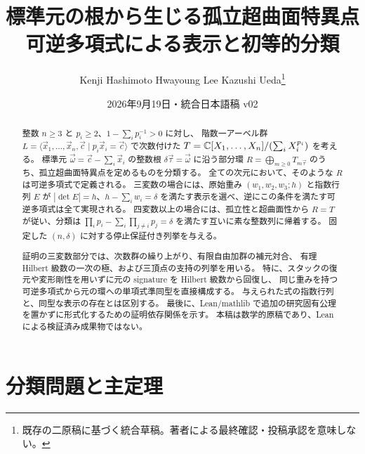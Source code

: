 \documentclass[11pt,a4paper]{ltjsarticle}
\title{標準元の根から生じる孤立超曲面特異点\\[3pt]
\large 可逆多項式による表示と初等的分類}
\author{Kenji Hashimoto \qquad Hwayoung Lee \qquad Kazushi Ueda\thanks{既存の二原稿に基づく統合草稿。著者による最終確認・投稿承認を意味しない。}}
\date{2026年9月19日・統合日本語稿 v02}
\numberwithin{equation}{section}
\theoremstyle{definition}
\newcommand{\cc}{\vec c}\newcommand{\xx}{\vec x}\newcommand{\om}{\vec\omega}\newcommand{\ta}{\vec\tau}
\begin{document}
\maketitle
\begin{abstract}
整数 $n\ge3$ と $p_i\ge2$、$1-\sum_i p_i^{-1}>0$ に対し、
階数一アーベル群 $L=\langle\xx_1,\dots,\xx_n,\cc\mid p_i\xx_i=\cc\rangle$ で次数付けた
$T=\mathbb C[X_1,\dots,X_n]/(\sum_i X_i^{p_i})$ を考える。
標準元 $\om=\cc-\sum_i\xx_i$ の整数根 $\delta\ta=\om$ に沿う部分環
$R=\bigoplus_{m\ge0}T_{m\ta}$ のうち、孤立超曲面特異点を定めるものを分類する。
全ての次元において、そのような $R$ は可逆多項式で定義される。
三変数の場合には、原始重み $(w_1,w_2,w_3;h)$ と指数行列 $E$ が
$|\det E|=h$、$h-\sum_iw_i=\delta$ を満たす表示を選べ、逆にこの条件を満たす可逆多項式は全て実現される。
四変数以上の場合には、孤立性と超曲面性から $R=T$ が従い、分類は
$\prod_i p_i-\sum_i\prod_{j\ne i}p_j=\delta$ を満たす互いに素な整数列に帰着する。
固定した $(n,\delta)$ に対する停止保証付き列挙を与える。

証明の三変数部分では、次数群の繰り上がり、有限自由加群の補元対合、
有理 Hilbert 級数の一次の極、および三頂点の支持の列挙を用いる。
特に、スタックの復元や変形剛性を用いずに元の signature を Hilbert 級数から回復し、
同じ重みを持つ可逆多項式から元の環への単項式準同型を直接構成する。
与えられた式の指数行列と、同型な表示の存在とは区別する。
最後に、Lean/mathlib で追加の研究固有公理を置かずに形式化するための証明依存関係を示す。
本稿は数学的原稿であり、Lean による検証済み成果物ではない。
\end{abstract}
\clearpage
\setcounter{tocdepth}{1}
\tableofcontents
\clearpage

\section{分類問題と主定理}\label{sec:intro}
\end{document}
